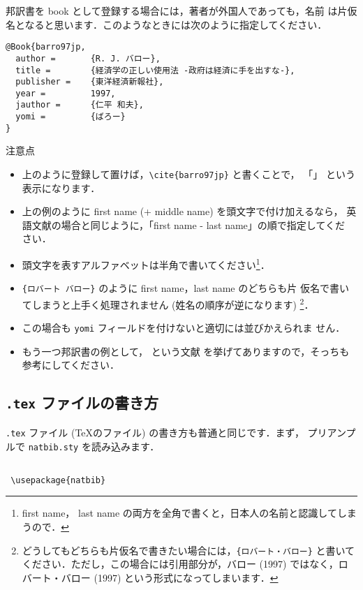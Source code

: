 \documentclass[a4j,10pt]{jarticle}
\begin{document}
邦訳書を book として登録する場合には，著者が外国人であっても，名前
は片仮名となると思います．このようなときには次のように指定してください．\\

\begin{screen}
 \begin{verbatim}
@Book{barro97jp,
  author =       {R. J. バロー},
  title =        {経済学の正しい使用法 -政府は経済に手を出すな-},
  publisher =    {東洋経済新報社},
  year =         1997,
  jauthor =      {仁平 和夫},
  yomi =         {ばろー}
}
 \end{verbatim}
\end{screen}

注意点
\begin{itemize}
\item 上のように登録して置けば，\verb|\cite{barro97jp}| と書くことで，
  「\cite{barro97jp}」 という表示になります．
\item 上の例のように first name (+ middle name) を頭文字で付け加えるなら，
  英語文献の場合と同じように，「first name - last name」の順で指定してくだ
  さい．
\item 頭文字を表すアルファベットは半角で書いてください\footnote{first name，
    last name の両方を全角で書くと，日本人の名前と認識してしまうので．}．
\item \verb|{ロバート バロー}| のように first name，last name のどちらも片
  仮名で書いてしまうと上手く処理されません (姓名の順序が逆になります)
  \footnote{どうしてもどちらも片仮名で書きたい場合には，\verb|{ロバート・バロー}| と書いてください．ただし，この場合には引用部分が，バロー (1997)
  ではなく，ロバート・バロー (1997) という形式になってしまいます．}．
\item この場合も \verb|yomi| フィールドを付けないと適切には並びかえられま
  せん．
\item もう一つ邦訳書の例として，\cite{markusen99jp:trade_vol_1} という文献
  を挙げてありますので，そっちも参考にしてください．
\end{itemize}




\subsection{\texttt{.tex} ファイルの書き方}

\texttt{.tex} ファイル (\TeX のファイル) の書き方も普通と同じです．まず，
プリアンプルで \texttt{natbib.sty} を読み込みます．

\begin{screen}
 \begin{verbatim}

 \usepackage{natbib}
 \end{verbatim}
\end{screen}
\end{document}

